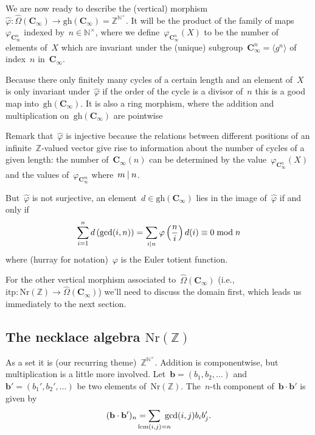 We are now ready to describe the (vertical) morphism~$\hat{\varphi}\colon\hat{\Omega}(\mathbf{C}_\infty)\to\mathrm{gh}(\mathbf{C}_\infty)=\mathbb{Z}^{\mathbb{N}^\times}$. It will be the product of the family of maps~$\varphi_{\mathbf{C}_\infty^n}$ indexed by~$n\in\mathbb{N}^\times$, where we define~$\varphi_{\mathbf{C}_\infty^n}(X)$ to be the number of elements of~$X$ which are invariant under the (unique) subgroup~$\mathbf{C}_\infty^n=\langle g^n\rangle$ of index~$n$ in~$\mathbf{C}_\infty$.

Because there only finitely many cycles of a certain length and an element of~$X$ is only invariant under~$\hat{\varphi}$ if the order of the cycle is a divisor of~$n$ this is a good map into~$\mathrm{gh}(\mathbf{C}_\infty)$. It is also a ring morphism, where the addition and multiplication on~$\mathrm{gh}(\mathbf{C}_\infty)$ are pointwise

Remark that~$\hat{\varphi}$ is injective because the relations between different positions of an infinite~$\mathbb{Z}$\nobreakdash-valued vector give rise to information about the number of cycles of a given length: the number of~$\mathbf{C}_\infty(n)$ can be determined by the value~$\varphi_{\mathbf{C}_\infty^n}(X)$ and the values of~$\varphi_{\mathbf{C}_\infty^m}$ where~$m\mathbin{|} n$.

But~$\hat{\varphi}$ is not surjective, an element~$d\in\mathrm{gh}(\mathbf{C}_\infty)$ lies in the image of~$\hat{\varphi}$ if and only if
\begin{equation}
  \sum_{i=1}^nd\left( \gcd(i,n) \right)=\sum_{i\mathbin{|} n}\varphi\left( \frac{n}{i} \right)d(i)\equiv 0\bmod n
\end{equation}
where (hurray for notation)~$\varphi$ is the Euler totient function.

For the other vertical morphism associated to~$\hat{\Omega}(\mathbf{C}_\infty)$ (i.e.,~$\mathrm{itp}\colon\mathrm{Nr}(\mathbb{Z})\to\hat{\Omega}(\mathbf{C}_\infty)$) we'll need to discuss the domain first, which leads us immediately to the next section.


\subsection{The necklace algebra $\mathrm{Nr}(\mathbb{Z})$}
As a set it is (our recurring theme)~$\mathbb{Z}^{\mathbb{N}^\times}$. Addition is componentwise, but multiplication is a little more involved. Let~$\mathbf{b}=(b_1,b_2,\ldots)$ and~$\mathbf{b}'=(b_1',b_2',\ldots)$ be two elements of~$\mathrm{Nr}(\mathbb{Z})$. The~$n$\nobreakdash-th component of~$\mathbf{b}\cdot\mathbf{b}'$ is given by
\begin{equation}
  (\mathbf{b}\cdot\mathbf{b}')_n=\sum_{\mathclap{\mathrm{lcm}(i,j)=n}}\ \gcd(i,j)b_ib_j'.
\end{equation}

